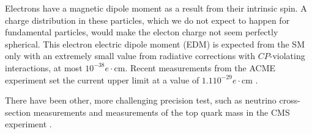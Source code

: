 Electrons have a magnetic dipole moment as a result from their intrinsic spin. A charge distribution in these particles, which we do not expect to happen for fundamental particles, would make the electon charge not seem perfectly spherical. This electron electric dipole moment (EDM) is expected from the SM only with an extremely small value from radiative corrections with $CP$-violating interactions, at most $10^{-38} e \cdot \textrm{cm}$. Recent measurements from the ACME experiment set the current upper limit at a value of  $1.1 10^{-29} e \cdot \textrm{cm}$ \cite{Cesarotti:2018huy}.

There have been other, more challenging precision test, such as neutrino cross-section measurements \cite{Aartsen:2017kpd} and measurements of the top quark mass in the CMS experiment \cite{Castro:2017yxe}.



